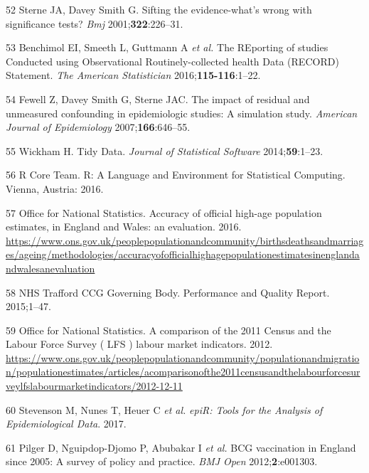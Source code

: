 \documentclass[11pt,twoside]{bristolthesis}
\begin{document}
  \leavevmode\hypertarget{ref-Sterne2001}{}%
  52 Sterne JA, Davey Smith G. Sifting the evidence-what's wrong with significance tests? \emph{Bmj} 2001;\textbf{322}:226--31.
  
  \leavevmode\hypertarget{ref-Benchimol2016a}{}%
  53 Benchimol EI, Smeeth L, Guttmann A \emph{et al.} The REporting of studies Conducted using Observational Routinely-collected health Data (RECORD) Statement. \emph{The American Statistician} 2016;\textbf{115-116}:1--22.
  
  \leavevmode\hypertarget{ref-Fewell2007}{}%
  54 Fewell Z, Davey Smith G, Sterne JAC. The impact of residual and unmeasured confounding in epidemiologic studies: A simulation study. \emph{American Journal of Epidemiology} 2007;\textbf{166}:646--55.
  
  \leavevmode\hypertarget{ref-Wickham2015}{}%
  55 Wickham H. Tidy Data. \emph{Journal of Statistical Software} 2014;\textbf{59}:1--23.
  
  \leavevmode\hypertarget{ref-R}{}%
  56 R Core Team. R: A Language and Environment for Statistical Computing. Vienna, Austria: 2016.
  
  \leavevmode\hypertarget{ref-storey2016}{}%
  57 Office for National Statistics. Accuracy of official high-age population estimates, in England and Wales: an evaluation. 2016. \url{https://www.ons.gov.uk/peoplepopulationandcommunity/birthsdeathsandmarriages/ageing/methodologies/accuracyofofficialhighagepopulationestimatesinenglandandwalesanevaluation}
  
  \leavevmode\hypertarget{ref-NHSTraffordCCGGoverningBody2015}{}%
  58 NHS Trafford CCG Governing Body. Performance and Quality Report. 2015;1--47.
  
  \leavevmode\hypertarget{ref-Date2012}{}%
  59 Office for National Statistics. A comparison of the 2011 Census and the Labour Force Survey ( LFS ) labour market indicators. 2012. \url{https://www.ons.gov.uk/peoplepopulationandcommunity/populationandmigration/populationestimates/articles/acomparisonofthe2011censusandthelabourforcesurveylfslabourmarketindicators/2012-12-11}
  
  \leavevmode\hypertarget{ref-EpiR}{}%
  60 Stevenson M, Nunes T, Heuer C \emph{et al.} \emph{epiR: Tools for the Analysis of Epidemiological Data}. 2017.
  
  \leavevmode\hypertarget{ref-Pilger2012b}{}%
  61 Pilger D, Nguipdop-Djomo P, Abubakar I \emph{et al.} BCG vaccination in England since 2005: A survey of policy and practice. \emph{BMJ Open} 2012;\textbf{2}:e001303.
  
\end{document}
